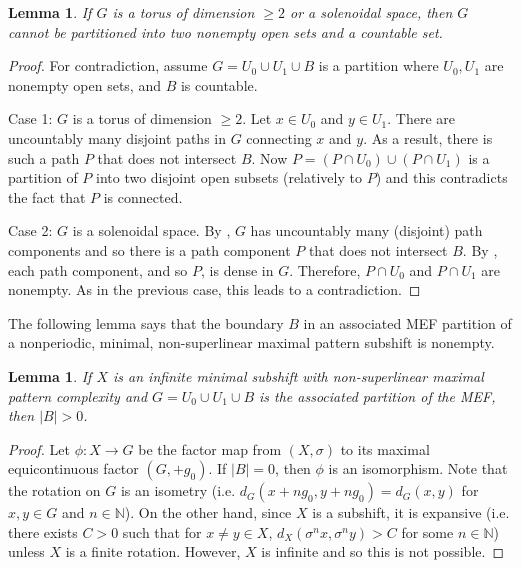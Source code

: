 \documentclass[11pt,reqno]{amsart}
\newtheorem{lemma}[theorem]{Lemma}
\theoremstyle{definition}
\theoremstyle{plain}
\newcommand{\N}{\mathbb{N}}
\newcommand{\AuthornoteA}[2]{{\sf\small\color{magenta}{[#1: #2]}}}
\newcommand{\AuthornoteR}[2]{{\sf\small\color{blue}{[#1: #2]}}}
\newcommand{\Anote}{\AuthornoteA{A}}
\newcommand{\rp}{\AuthornoteR{R}}
\begin{document}
\begin{lemma}\label{lem:solenoid_or_dim2_cannot_disconnect}
If $G$ is a torus of dimension $\geq 2$ or a solenoidal space, then $G$ cannot be partitioned into two nonempty open sets and a countable set.
\end{lemma}
\begin{proof}
For contradiction, assume $G = U_0 \cup U_1 \cup B$ is a partition where $U_0, U_1$ are nonempty open sets, and $B$ is countable.

Case 1: $G$ is a torus of dimension $\geq 2$. Let $x \in U_0$ and $y \in U_1$. There are uncountably many disjoint paths in $G$ connecting $x$ and $y$. As a result, there is such a path $P$ that does not intersect $B$. Now $P = (P \cap U_0) \cup (P \cap U_1)$ is a partition of $P$ into two disjoint open subsets (relatively to $P$) and this contradicts the fact that $P$ is connected.

Case 2: $G$ is a solenoidal space. By \cite[Corollary 5.11]{McCord-inverseLimitCovering}, $G$ has uncountably many (disjoint) path components and so there is a path component $P$ that does not intersect $B$. By \cite[Theorem 5.8]{McCord-inverseLimitCovering}, each path component, and so $P$, is dense in $G$. Therefore, $P \cap U_0$ and $P \cap U_1$ are nonempty. As in the previous case, this leads to a contradiction.
\end{proof}


The following lemma says that the boundary $B$ in an associated MEF partition of a nonperiodic, minimal, non-superlinear maximal pattern subshift is nonempty.

\begin{lemma}\label{lem:boundary_non_empty}
If $X$ is an infinite minimal subshift with non-superlinear maximal pattern complexity and $G = U_0 \cup U_1 \cup B$ is the associated partition of the MEF, then $|B| > 0$.
\end{lemma}
\begin{proof}
Let $\phi: X \to G$ be the factor map from $(X, \sigma)$ to its maximal equicontinuous factor $(G, +g_0)$. If $|B| = 0$, then $\phi$ is an isomorphism. Note that the rotation on $G$ is an isometry (i.e. $d_G(x + n g_0, y + n g_0) = d_G(x, y)$ for $x, y \in G$ and $n \in \N$). %
On the other hand, since $X$ is a subshift, it is expansive (i.e. there exists $C > 0$ such that for $x \neq y \in X$, $d_X(\sigma^n x, \sigma^n y) > C$ for some $n \in \N$) unless $X$ is a finite rotation. However, $X$ is infinite and so this is not possible.


\end{proof}
\end{document}
